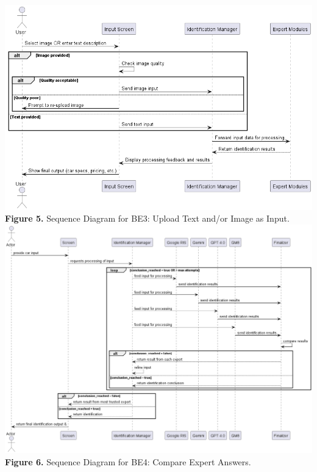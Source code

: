 \documentclass[]{article}
\begin{document}
\begin{center}
	\includegraphics[scale=0.55]{Sequence Diagrams/BE3_Sequence_Diagram.png}\\
	\textbf{Figure 5.} Sequence Diagram for BE3: Upload Text and/or Image as Input.\\

	\includegraphics[scale=0.4]{Sequence Diagrams/BE4_Sequence_Diagram.png}\\
	\textbf{Figure 6.} Sequence Diagram for BE4: Compare Expert Answers.\\


\end{center}
\end{document}
